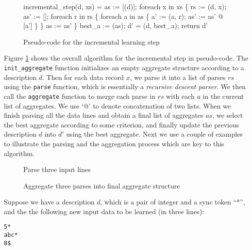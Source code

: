 \begin{figure}[t]
\begin{codebox}
incremental_step(d, xs) =
  as := [(d)];
  foreach x in xs \{
    rs := (d, x);
    as' := [];
    foreach r in rs \{
      foreach a in as \{
        a' := (a, r); 
        as' := as' @ [a']
      \}
    \}
    as := as'
  \} 
  best_a := (as);
  d' = (d, best_a);  
  return d'
\end{codebox}
\caption{Pseudo-code for the incremental learning step}
\label{fig:inc-learning}
\end{figure}

Figure \ref{fig:inc-learning} shows the overall algorithm for the incremental step in
pseudo-code. The {\tt init\_aggregate} function initializes an empty aggregate
structure according to a description $d$.  
Then for each data record $x$, we parse it into a list of parses $rs$
using the {\tt parse} function, which is essentially a {\em recursive descent parser}. 
We then call the {\tt aggregate} function to merge
each parse in $rs$ with each $a$ in the current list of aggregates. We use `@' to denote
concatenation of two lists. When we finish
parsing all the data lines and obtain a final list of aggregates $as$, we select
the best aggregate according to some criterion, and finally update the previous description
$d$ into $d'$ using the best aggregate. Next we use a couple of examples to
illustrate the parsing and the aggregation process which are key to this algorithm.

\begin{figure}[t]
\begin{center}
\caption{Parse three input lines}\label{fig:parse}
\end{center}
\end{figure}

\begin{figure*}[t]
\begin{center}
\caption{Aggregate three parses into final aggregate structure}\label{fig:aggregate}
\end{center}
\end{figure*}

Suppose we have a description $d$, which is a pair of integer and a sync token ``*'',
and the the following new input data to be learned (in three lines):
{\small
\begin{verbatim}
5*
abc*
8$
\end{verbatim}
}

